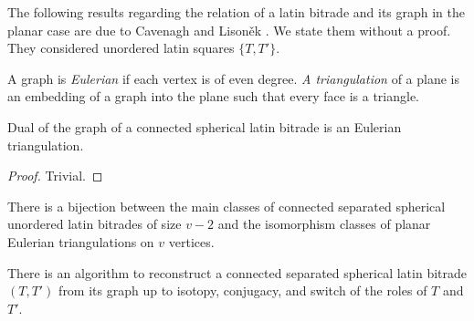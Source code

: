 The following results regarding the relation of a latin bitrade and its graph in the planar case are due to Cavenagh and Lisoněk \cite{CavenaghLisonek08}. We state them without a proof. They considered unordered latin squares $\{T,T'\}$. 

\begin{defn}
A graph is \emph{Eulerian} if each vertex is of even degree. \emph{A triangulation} of a plane is an embedding of a graph into the plane such that every face is a triangle.
\end{defn}

\begin{lem}
Dual of the graph of a connected spherical latin bitrade is an Eulerian triangulation.
\end{lem}
\begin{proof}
Trivial.
\end{proof}

\begin{thm}
\label{thm:connected-spherical-separated}
There is a bijection between the main classes of connected separated spherical unordered latin bitrades of size $v-2$ and the isomorphism classes of planar Eulerian triangulations on $v$ vertices.
\end{thm}%

\begin{cor}
\label{cor:connected-spherical-separated}
There is an algorithm to reconstruct a connected separated spherical latin bitrade $(T,T')$ from its graph up to isotopy, conjugacy, and switch of the roles of $T$ and $T'$.
\end{cor}%



